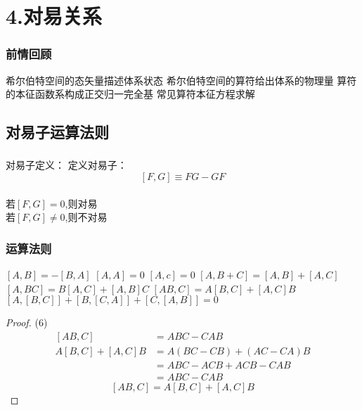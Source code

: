 

\section{4.对易关系}

\begin{frame}
    \frametitle{前情回顾}
    \begin{itemize}
        \Item 希尔伯特空间的态矢量描述体系状态
        \Item 希尔伯特空间的算符给出体系的物理量
        \Item 算符的本征函数系构成正交归一完全基
        \Item 常见算符本征方程求解
    \end{itemize}   
\end{frame} 

\subsection{对易子运算法则}

\begin{frame} 
    \frametitle{}
    \begin{tcolorbox1}{对易子定义：}
        定义对易子：$$ [F,G]\equiv FG-GF $$ \\
        若$[F,G]=0$,则对易 \\
        若$[F,G]\neq0$,则不对易  
    \end{tcolorbox1}
\end{frame} 

\begin{frame} 
    \frametitle{运算法则}
    \begin{enumerate}
        \Item  $[A,B]=-[B,A]$
        \Item  $[A,A]=0$
        \Item  $[A,c]=0$
        \Item  $[A,B+C]=[A,B]+[A,C]$
        \Item  $[A,BC]=B[A,C]+[A,B]C$
        \Item  $[AB,C]=A[B,C]+[A,C]B$
        \Item  $[A,[B,C]] + [B,[C,A]] + [C,[A,B]] =0$
    \end{enumerate}
\end{frame} 
\begin{frame}
    \begin{proof}{(6)}   
        \begin{equation*}
            \begin{split} 
            [AB,C]&=ABC-CAB \\
            A[B,C]+[A,C]B&=A(BC-CB)+(AC-CA)B\\
            &=ABC-ACB+ACB-CAB\\
            &=ABC-CAB
            \end{split}  
        \end{equation*}  
        $$ [AB,C]=A[B,C]+[A,C]B $$
    \end{proof}
\end{frame} 

